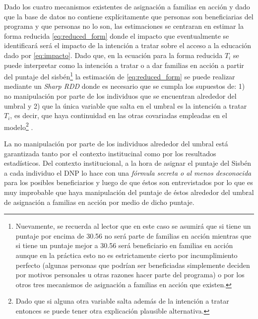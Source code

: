 \documentclass[AER]{AEA}
\begin{document}
Dado los cuatro mecanismos existentes de asignación a familias en acción y dado que la base de datos no contiene explícitamente que personas son beneficiarias del programa y que personas no lo son, las estimaciones se centraran en estimar la forma reducida \ref{eq:reduced_form} donde el impacto que eventualmente se identificará será el impacto de la intención a tratar sobre el acceso a la educación dado por \ref{eq:impacto}. Dado que, en la ecuación para la forma reducida $T_i$ se puede interpretar como la intención a tratar o a dar familias en acción a partir del puntaje del sisbén\footnote{Nuevamente, se recuerda al lector que en este caso se asumirá que si tiene un puntaje por encima de 30.56 no será parte de familias en acción mientras que si tiene un puntaje mejor a 30.56 será beneficiario en familias en acción aunque en la práctica esto no es estrictamente cierto por incumplimiento perfecto (algunas personas que podrían ser beneficiadas simplemente deciden por motivos personales u otras razones hacer parte del programa) o por los otros tres mecanismos de asignación a familias en acción que existen.} la estimación de \ref{eq:reduced_form} se puede realizar mediante un \textit{Sharp RDD} donde es necesario que se cumpla los supuestos de: 1) no manipulación por parte de los individuos que se encuentran alrededor del umbral y 2) que la única variable que salta en el umbral es la intención a tratar $T_i$, es decir, que haya continuidad en las otras covariadas empleadas en el modelo\footnote{Dado que si alguna otra variable salta además de la intención a tratar entonces se puede tener otra explicación plausible alternativa.} \citep{Cunningham2018CAUSAL1.7}.\

La no manipulación por parte de los individuos alrededor del umbral está garantizada tanto por el contexto institucinal como por los resultados estadísticos. Del contexto institucional, a la hora de asignar el puntaje del Sisbén a cada individuo el DNP lo hace con una \textit{fórmula secreta o al menos desconocida} para los posibles beneficiarios y luego de que éstos son entrevistados por lo que es muy improbable que haya manipulación del puntaje de éstos alrededor del umbral de asignación a familias en acción por medio de dicho puntaje. 
\end{document}
